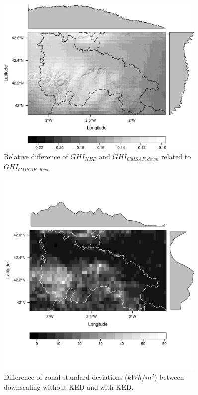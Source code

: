 \documentclass[11pt, english]{article}
\begin{document}
\begin{figure}[H]
  \centering
  \includegraphics[width=0.9\textwidth]{diffwithKED.pdf}
  \caption{Relative difference of $GHI_{KED}$ and $GHI_{CMSAF, down}$  related to $GHI_{CMSAF, down}$}
  \label{fig:diffKEDcmsaf}
\end{figure}


\begin{figure}[H]
  \centering
  \includegraphics[width=0.9\textwidth]{resta.pdf}
  \caption{Difference of zonal standard deviations ($kWh/m^2$) between downscaling without KED and with KED.}
  \label{fig:zonal}
\end{figure}
\end{document}
